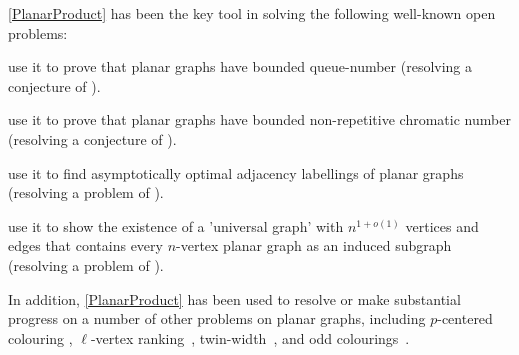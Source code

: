 \documentclass{patmorin}
\theoremstyle{plain}
\theoremstyle{definition}
\begin{document}
\noindent\cref{PlanarProduct} has been the key tool in solving the following well-known open problems:
\begin{compactitem}
\item \citet{DJMMUW20} use it to prove that planar graphs have bounded queue-number (resolving a conjecture of \citet{HLR92}).
\item  \citet{dujmovic.esperet.ea:planar} use it to prove that planar graphs have bounded non-repetitive chromatic number (resolving a conjecture of \citet{AGHR-RSA02}).
\item \citet{DEJGMM21} use it to find asymptotically optimal adjacency labellings of planar graphs (resolving a problem of \citet{kannan.naor.ea:implicit}).
\item \citet{EJM} use it to show the existence of a 'universal graph' with $n^{1+o(1)}$ vertices and edges that contains every $n$-vertex planar graph as an induced subgraph (resolving a problem of \citet{babai.chung.ea:on}).
\end{compactitem}
In addition, \cref{PlanarProduct} has been used to resolve or make substantial progress on a number of other problems on planar graphs, including $p$-centered colouring \cite{DFMS21}, $\ell$-vertex ranking~\citep{BDJM}, twin-width~\citep{BKW}, and odd colourings~\citep{DMO}.

\end{document}
